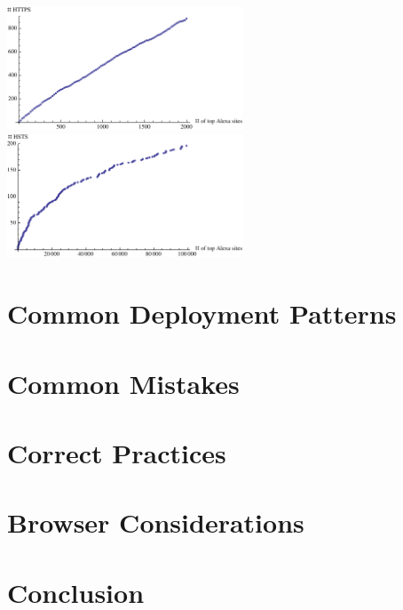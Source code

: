 \documentclass[conference]{./IEEEtran}
\theoremstyle{plain}
\begin{document}
\begin{center}
\includegraphics[width=70mm]{alexa_https.pdf}
\includegraphics[width=70mm]{alexa_hsts.pdf}
\end{center}

\section{Common Deployment Patterns}

\section{Common Mistakes}

\section{Correct Practices}

\section{Browser Considerations}

\section{Conclusion}




\end{document}

